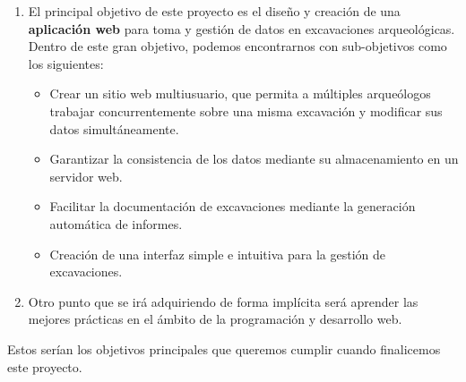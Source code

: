     \begin{enumerate}
        \item El principal objetivo de este proyecto es el diseño y creación de una
        \textbf{aplicación web} para toma y gestión de datos en excavaciones arqueológicas.
        Dentro de este gran objetivo, podemos encontrarnos con sub-objetivos como los
        siguientes:
            \begin{itemize}
                \item Crear un sitio web multiusuario, que permita a múltiples arqueólogos
                trabajar concurrentemente sobre una misma excavación y modificar sus datos
                simultáneamente.
                \item Garantizar la consistencia de los datos mediante su almacenamiento en
                un servidor web.
                \item Facilitar la documentación de excavaciones mediante la generación
                automática de informes.
                \item Creación de una interfaz simple e intuitiva para la gestión de
                excavaciones.
            \end{itemize}
            \item Otro punto que se irá adquiriendo de forma implícita será aprender las
            mejores prácticas en el ámbito de la programación y desarrollo web.
    \end{enumerate}

Estos serían los objetivos principales que queremos cumplir cuando finalicemos este proyecto. 

